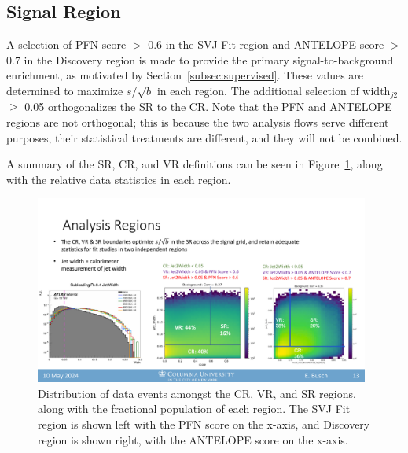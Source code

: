 \subsection{Signal Region}
\label{subec:sel_sr}

A selection of PFN score $>$ 0.6 in the SVJ Fit region and ANTELOPE score $>$ 0.7 in the Discovery region is made to provide the primary signal-to-background enrichment, as motivated by Section~\ref{subsec:supervised}.
These values are determined to maximize $s/\sqrt{b}$ in each region.
The additional selection of {width$_{j2}$ $\geq$ 0.05} orthogonalizes the SR to the CR.
Note that the PFN and ANTELOPE regions are not orthogonal; this is because the two analysis flows serve different purposes, their statistical treatments are different, and they will not be combined. 

A summary of the SR, CR, and VR definitions can be seen in Figure~\ref{fig:crvrsr_2d}, along with the relative data statistics in each region.
\begin{figure}[!htbp]
\centering
    \includegraphics[width=0.98\textwidth]{figures/eventsel/crvrsr_2d}
    \caption{Distribution of data events amongst the CR, VR, and SR regions, along with the fractional population of each region. The SVJ Fit region is shown left with the PFN score on the x-axis, and Discovery region is shown right, with the ANTELOPE score on the x-axis.
    \label{fig:crvrsr_2d}}
\end{figure}

